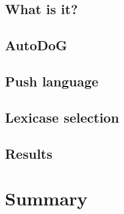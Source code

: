 \documentclass{beamer}
\begin{document}
\subsection{What is it?}


\subsection{AutoDoG}


\subsection{Push language}
\subsection{Lexicase selection}
\subsection{Results}

\section[Summary]{Summary}
\end{document}
